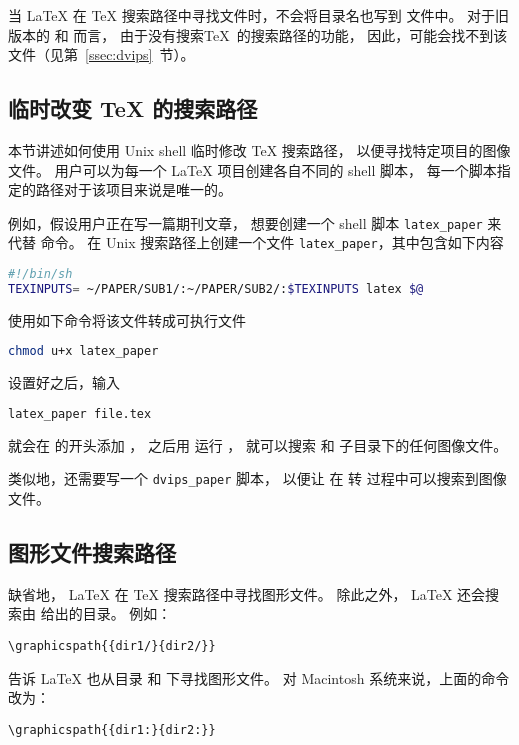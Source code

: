 当 \LaTeX{} 在 \TeX{} 搜索路径中寻找文件时，不会将目录名也写到  文件中。
对于旧版本的  和  而言，
由于没有搜索\TeX{}~的搜索路径的功能，
因此，可能会找不到该文件（见第~\ref{ssec:dvips}~节）。









\subsection{临时改变 \TeX{} 的搜索路径}\label{ssec:temptexpath}

本节讲述如何使用 Unix shell 临时修改 \TeX{} 搜索路径，
以便寻找特定项目的图像文件。
用户可以为每一个 \LaTeX{} 项目创建各自不同的 shell 脚本，
每一个脚本指定的路径对于该项目来说是唯一的。

例如，假设用户正在写一篇期刊文章，
想要创建一个 shell 脚本 \verb|latex_paper| 来代替  命令。
在 Unix 搜索路径上创建一个文件 \verb|latex_paper|，其中包含如下内容
\begin{lstlisting}[language=sh]
#!/bin/sh
TEXINPUTS= ~/PAPER/SUB1/:~/PAPER/SUB2/:$TEXINPUTS latex $@
\end{lstlisting}
使用如下命令将该文件转成可执行文件
\begin{lstlisting}[language=sh]
chmod u+x latex_paper
\end{lstlisting}

设置好之后，输入
\begin{lstlisting}[language=sh]
latex_paper file.tex
\end{lstlisting}
就会在  的开头添加 ，
之后用  运行 ，
就可以搜索  和  子目录下的任何图像文件。

类似地，还需要写一个 \verb|dvips_paper| 脚本，
以便让  在  转  过程中可以搜索到图像文件。

\subsection{图形文件搜索路径}\label{ssec:graphpath}
缺省地， \LaTeX{} 在 \TeX{} 搜索路径中寻找图形文件。
除此之外， \LaTeX{} 还会搜索由  给出的目录。
例如：
\begin{lstlisting}
\graphicspath{{dir1/}{dir2/}}
\end{lstlisting}
告诉 \LaTeX{} 也从目录  和  下寻找图形文件。
对 Macintosh 系统来说，上面的命令改为：
\begin{lstlisting}
\graphicspath{{dir1:}{dir2:}}
\end{lstlisting}

